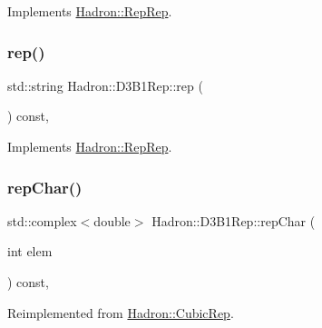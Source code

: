 Implements \mbox{\hyperlink{structHadron_1_1RepRep_ab3213025f6de249f7095892109575fde}{Hadron\+::\+Rep\+Rep}}.

\mbox{\label{structHadron_1_1D3B1Rep_a12a506574bb30503f11952150a0a7d6f}} 
\subsubsection{\texorpdfstring{rep()}{rep()}\hspace{0.1cm}{\footnotesize\ttfamily [3/3]}}
{\footnotesize\ttfamily std\+::string Hadron\+::\+D3\+B1\+Rep\+::rep (\begin{DoxyParamCaption}{ }\end{DoxyParamCaption}) const\hspace{0.3cm}{\ttfamily [inline]}, {\ttfamily [virtual]}}



Implements \mbox{\hyperlink{structHadron_1_1RepRep_ab3213025f6de249f7095892109575fde}{Hadron\+::\+Rep\+Rep}}.

\mbox{\label{structHadron_1_1D3B1Rep_a3a5bf413079f99bedafb7134af0e5af1}} 
\subsubsection{\texorpdfstring{repChar()}{repChar()}\hspace{0.1cm}{\footnotesize\ttfamily [1/2]}}
{\footnotesize\ttfamily std\+::complex$<$double$>$ Hadron\+::\+D3\+B1\+Rep\+::rep\+Char (\begin{DoxyParamCaption}\item[{int}]{elem }\end{DoxyParamCaption}) const\hspace{0.3cm}{\ttfamily [inline]}, {\ttfamily [virtual]}}



Reimplemented from \mbox{\hyperlink{structHadron_1_1CubicRep_af45227106e8e715e84b0af69cd3b36f8}{Hadron\+::\+Cubic\+Rep}}.

